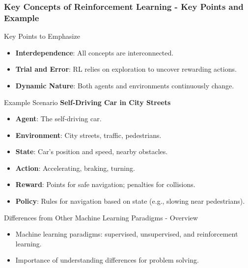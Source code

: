 \documentclass[aspectratio=169]{beamer}
\begin{document}
\begin{frame}[fragile]
    \frametitle{Key Concepts of Reinforcement Learning - Key Points and Example}
    \begin{block}{Key Points to Emphasize}
        \begin{itemize}
            \item \textbf{Interdependence}: All concepts are interconnected.
            \item \textbf{Trial and Error}: RL relies on exploration to uncover rewarding actions.
            \item \textbf{Dynamic Nature}: Both agents and environments continuously change.
        \end{itemize}
    \end{block}
    
    \begin{block}{Example Scenario}
        \textbf{Self-Driving Car in City Streets}
        \begin{itemize}
            \item \textbf{Agent}: The self-driving car.
            \item \textbf{Environment}: City streets, traffic, pedestrians.
            \item \textbf{State}: Car's position and speed, nearby obstacles.
            \item \textbf{Action}: Accelerating, braking, turning.
            \item \textbf{Reward}: Points for safe navigation; penalties for collisions.
            \item \textbf{Policy}: Rules for navigation based on state (e.g., slowing near pedestrians).
        \end{itemize}
    \end{block}
\end{frame}

\begin{frame}[fragile]{Differences from Other Machine Learning Paradigms - Overview}
    \begin{itemize}
        \item Machine learning paradigms: supervised, unsupervised, and reinforcement learning.
        \item Importance of understanding differences for problem solving.
    \end{itemize}
\end{frame}
\end{document}
